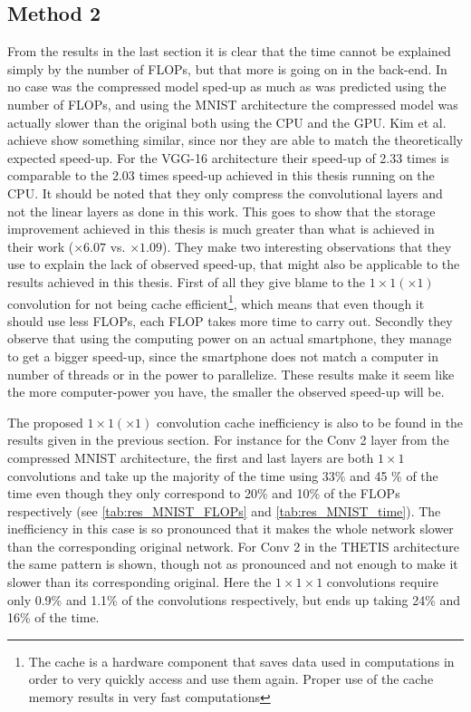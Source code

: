 \subsection{Method 2}
From the results in the last section it is clear that the time cannot be explained simply by the number of FLOPs, but that more is going on in the back-end. In no case was the compressed model sped-up as much as was predicted using the number of FLOPs, and using the MNIST architecture the compressed model was actually slower than the original both using the CPU and the GPU. Kim et al. achieve show something similar\cite{Kim2016}, since nor they are able to match the theoretically expected speed-up. For the VGG-16 architecture their speed-up of 2.33 times is comparable to the 2.03 times speed-up achieved in this thesis running on the CPU. It should be noted that they only compress the convolutional layers and not the linear layers as done in this work. This goes to show that the storage improvement achieved in this thesis is much greater than what is achieved in their work ($\times 6.07$ vs. $\times 1.09$). They make two interesting observations that they use to explain the lack of observed speed-up, that might also be applicable to the results achieved in this thesis. First of all they give blame to the $1\times 1 (\times 1)$ convolution for not being cache efficient\footnote{The cache is a hardware component that saves data used in computations in order to very quickly access and use them again. Proper use of the cache memory results in very fast computations}, which means that even though it should use less FLOPs, each FLOP takes more time to carry out. Secondly they observe that using the computing power on an actual smartphone, they manage to get a bigger speed-up, since the smartphone does not match a computer in number of threads or in the power to parallelize. These results make it seem like the more computer-power you have, the smaller the observed speed-up will be. 

The proposed $1\times 1 (\times 1)$ convolution cache inefficiency is also to be found in the results given in  the previous section. For instance for the Conv 2 layer from the compressed MNIST architecture, the first and last layers are both $1\times 1$ convolutions and take up the majority of the time using 33\% and 45 \% of the time even though they only correspond to 20\% and 10\% of the FLOPs respectively (see \autoref{tab:res_MNIST_FLOPs} and \autoref{tab:res_MNIST_time}). The inefficiency in this case is so pronounced that it makes the whole network slower than the corresponding original network. For Conv 2 in the THETIS architecture the same pattern is shown, though not as pronounced and not enough to make it slower than its corresponding original. Here the $1\times 1 \times 1$ convolutions require only 0.9\% and 1.1\% of the convolutions respectively, but ends up taking 24\% and 16\% of the time.

